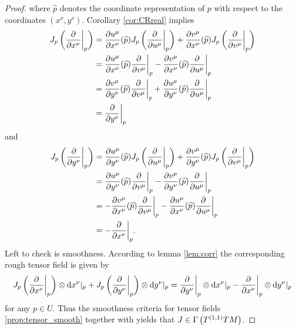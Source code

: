 \begin{proof}
\noindent where $\widehat{p}$ denotes the coordinate representation of $p$ with respect to the coordinates $(x^\nu,y^\nu)$. Corollary \ref{cor:CRreal} implies
\begin{align*}
J_p\del[3]{\frac{\partial}{\partial x^\nu}\bigg\vert_p} &= \frac{\partial u^\mu}{\partial x^\nu}(\widehat{p})J_p\del[3]{\frac{\partial}{\partial u^\mu}\bigg\vert_p} + \frac{\partial v^\mu}{\partial x^\nu}(\widehat{p})J_p\del[3]{\frac{\partial}{\partial v^\mu}\bigg\vert_p}\\
&= \frac{\partial u^\mu}{\partial x^\nu}(\widehat{p})\frac{\partial}{\partial v^\mu}\bigg\vert_p - \frac{\partial v^\mu}{\partial x^\nu}(\widehat{p})\frac{\partial}{\partial u^\mu}\bigg\vert_p\\
&= \frac{\partial v^\mu}{\partial y^\nu}(\widehat{p})\frac{\partial}{\partial v^\mu}\bigg\vert_p + \frac{\partial u^\mu}{\partial y^\nu}(\widehat{p})\frac{\partial}{\partial u^\mu}\bigg\vert_p\\
&= \frac{\partial}{\partial y^\nu}\bigg\vert_p
\end{align*}
\noindent and
\begin{align*}
J_p\del[3]{\frac{\partial}{\partial y^\nu}\bigg\vert_p} &= \frac{\partial u^\mu}{\partial y^\nu}(\widehat{p})J_p\del[3]{\frac{\partial}{\partial u^\mu}\bigg\vert_p} + \frac{\partial v^\mu}{\partial y^\nu}(\widehat{p})J_p\del[3]{\frac{\partial}{\partial v^\mu}\bigg\vert_p}\\
&= \frac{\partial u^\mu}{\partial y^\nu}(\widehat{p})\frac{\partial}{\partial v^\mu}\bigg\vert_p - \frac{\partial v^\mu}{\partial y^\nu}(\widehat{p})\frac{\partial}{\partial u^\mu}\bigg\vert_p\\
&= -\frac{\partial v^\mu}{\partial x^\nu}(\widehat{p})\frac{\partial}{\partial v^\mu}\bigg\vert_p - \frac{\partial u^\mu}{\partial x^\nu}(\widehat{p})\frac{\partial}{\partial u^\mu}\bigg\vert_p\\
&= -\frac{\partial}{\partial x^\nu}\bigg\vert_p.
\end{align*}
Left to check is smoothness. According to lemma \ref{lem:corr} the corresponding rough tensor field is given by
\begin{equation*}
J_p\del[3]{\frac{\partial}{\partial x^\nu}\bigg\vert_p} \otimes \d x^\nu\vert_p + J_p\del[3]{\frac{\partial}{\partial y^\nu}\bigg\vert_p} \otimes \d y^\nu\vert_p = \frac{\partial}{\partial y^\nu}\bigg\vert_p \otimes \d x^\nu\vert_p - \frac{\partial}{\partial x^\nu}\bigg\vert_p \otimes \d y^\nu\vert_p
\end{equation*}
\noindent for any $p \in U$. Thus the smoothness criteria for tensor fields \ref{prop:tensor_smooth} together with \cite[36]{lee:smooth_manifolds:2013} yields that $J \in \Gamma\del[1]{T^{(1,1)}TM}$.
\end{proof}

